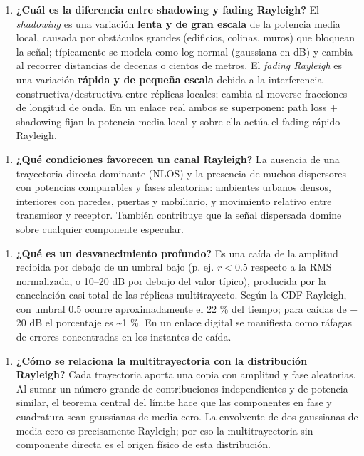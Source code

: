 \documentclass[11pt,a4paper]{article}
\begin{document}
\begin{enumerate}
  \item \textbf{¿Cuál es la diferencia entre shadowing y fading Rayleigh?} El \emph{shadowing} es una variación \textbf{lenta y de gran escala} de la potencia media local, causada por obstáculos grandes (edificios, colinas, muros) que bloquean la señal; típicamente se modela como log-normal (gaussiana en dB) y cambia al recorrer distancias de decenas o cientos de metros. El \emph{fading Rayleigh} es una variación \textbf{rápida y de pequeña escala} debida a la interferencia constructiva/destructiva entre réplicas locales; cambia al moverse fracciones de longitud de onda. En un enlace real ambos se superponen: path loss + shadowing fijan la potencia media local y sobre ella actúa el fading rápido Rayleigh.
\end{enumerate}

\begin{enumerate}
  \item \textbf{¿Qué condiciones favorecen un canal Rayleigh?} La ausencia de una trayectoria directa dominante (NLOS) y la presencia de muchos dispersores con potencias comparables y fases aleatorias: ambientes urbanos densos, interiores con paredes, puertas y mobiliario, y movimiento relativo entre transmisor y receptor. También contribuye que la señal dispersada domine sobre cualquier componente especular.
\end{enumerate}

\begin{enumerate}
  \item \textbf{¿Qué es un desvanecimiento profundo?} Es una caída de la amplitud recibida por debajo de un umbral bajo (p. ej. $r<0.5$ respecto a la RMS normalizada, o 10--20 dB por debajo del valor típico), producida por la cancelación casi total de las réplicas multitrayecto. Según la CDF Rayleigh, con umbral 0.5 ocurre aproximadamente el 22 \% del tiempo; para caídas de $-$20 dB el porcentaje es \textasciitilde{}1 \%. En un enlace digital se manifiesta como ráfagas de errores concentradas en los instantes de caída.
\end{enumerate}

\begin{enumerate}
  \item \textbf{¿Cómo se relaciona la multitrayectoria con la distribución Rayleigh?} Cada trayectoria aporta una copia con amplitud y fase aleatorias. Al sumar un número grande de contribuciones independientes y de potencia similar, el teorema central del límite hace que las componentes en fase y cuadratura sean gaussianas de media cero. La envolvente de dos gaussianas de media cero es precisamente Rayleigh; por eso la multitrayectoria sin componente directa es el origen físico de esta distribución.
\end{enumerate}
\end{document}
